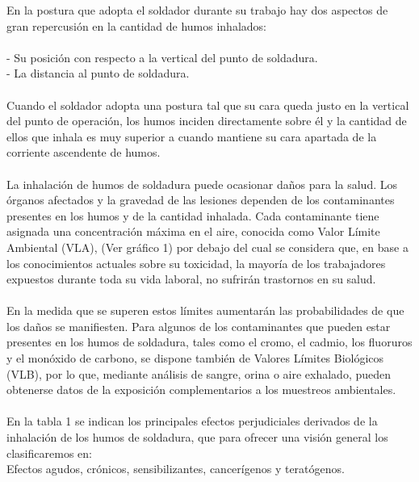 \documentclass[12pt,letterpaper]{article}
\begin{document}
\newpage
En la postura que adopta el soldador durante su trabajo hay dos aspectos de gran repercusión en la cantidad de humos inhalados:
\\\\
- Su posición con respecto a la vertical del punto de soldadura. 
\\
- La distancia al punto de soldadura.
\\\\
Cuando el soldador adopta una postura tal que su cara queda justo en la vertical del punto de operación, los humos inciden directamente sobre él y la cantidad de ellos que inhala es muy superior a cuando mantiene su cara apartada de la corriente ascendente de humos.
\\\\
La inhalación de humos de soldadura puede ocasionar daños para la salud. Los órganos afectados y la gravedad de las lesiones dependen de los contaminantes presentes en los humos y de la cantidad inhalada. 
Cada contaminante tiene asignada una concentración máxima en el aire, conocida como Valor Límite Ambiental (VLA), (Ver gráfico 1) por debajo del cual se considera que, en base a los conocimientos actuales sobre su toxicidad, la mayoría de los trabajadores expuestos durante toda su vida laboral, no sufrirán trastornos en su salud.
\\\\
En la medida que se superen estos límites aumentarán las probabilidades de que los daños se manifiesten. Para algunos de los contaminantes que pueden estar presentes en los humos de soldadura, tales como el cromo, el cadmio, los fluoruros y el monóxido de carbono, se dispone también de Valores Límites Biológicos (VLB), por lo que, mediante análisis de sangre, orina o aire exhalado, pueden obtenerse datos de la exposición complementarios a los muestreos ambientales. 
\\\\
En la tabla 1 se indican los principales efectos perjudiciales derivados de la inhalación de los humos de soldadura, que para ofrecer una visión general los clasificaremos en:
\\
Efectos agudos, crónicos, sensibilizantes, cancerígenos y teratógenos.
\end{document}
